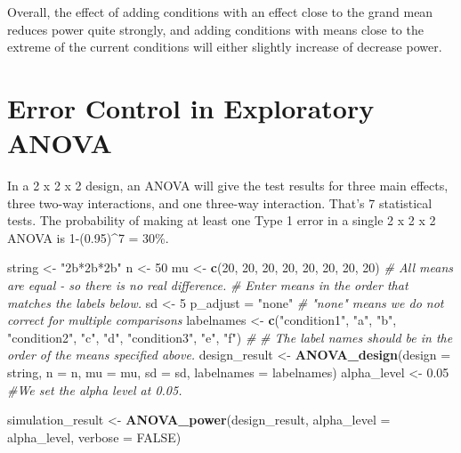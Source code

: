 \documentclass[]{book}
\newenvironment{Shaded}{\begin{snugshade}}{\end{snugshade}}
\newcommand{\CommentTok}[1]{\textcolor[rgb]{0.56,0.35,0.01}{\textit{#1}}}
\newcommand{\DataTypeTok}[1]{\textcolor[rgb]{0.13,0.29,0.53}{#1}}
\newcommand{\DecValTok}[1]{\textcolor[rgb]{0.00,0.00,0.81}{#1}}
\newcommand{\FloatTok}[1]{\textcolor[rgb]{0.00,0.00,0.81}{#1}}
\newcommand{\KeywordTok}[1]{\textcolor[rgb]{0.13,0.29,0.53}{\textbf{#1}}}
\newcommand{\NormalTok}[1]{#1}
\newcommand{\OtherTok}[1]{\textcolor[rgb]{0.56,0.35,0.01}{#1}}
\newcommand{\StringTok}[1]{\textcolor[rgb]{0.31,0.60,0.02}{#1}}
\begin{document}
Overall, the effect of adding conditions with an effect close to the grand mean reduces power quite strongly, and adding conditions with means close to the extreme of the current conditions will either slightly increase of decrease power.

\hypertarget{error-control-in-exploratory-anova}{%
\chapter{Error Control in Exploratory ANOVA}\label{error-control-in-exploratory-anova}}

In a 2 x 2 x 2 design, an ANOVA will give the test results for three main effects, three two-way interactions, and one three-way interaction. That's 7 statistical tests. The probability of making at least one Type 1 error in a single 2 x 2 x 2 ANOVA is 1-(0.95)\^{}7 = 30\%.

\begin{Shaded}
\begin{Highlighting}[]
\NormalTok{string <-}\StringTok{ "2b*2b*2b"}
\NormalTok{n <-}\StringTok{ }\DecValTok{50}
\NormalTok{mu <-}\StringTok{ }\KeywordTok{c}\NormalTok{(}\DecValTok{20}\NormalTok{, }\DecValTok{20}\NormalTok{, }\DecValTok{20}\NormalTok{, }\DecValTok{20}\NormalTok{, }\DecValTok{20}\NormalTok{, }\DecValTok{20}\NormalTok{, }\DecValTok{20}\NormalTok{, }\DecValTok{20}\NormalTok{) }
\CommentTok{# All means are equal - so there is no real difference.}
\CommentTok{# Enter means in the order that matches the labels below.}
\NormalTok{sd <-}\StringTok{ }\DecValTok{5}
\NormalTok{p_adjust =}\StringTok{ "none"}
\CommentTok{# "none" means we do not correct for multiple comparisons}
\NormalTok{labelnames <-}\StringTok{ }\KeywordTok{c}\NormalTok{(}\StringTok{"condition1"}\NormalTok{, }\StringTok{"a"}\NormalTok{, }\StringTok{"b"}\NormalTok{, }
                \StringTok{"condition2"}\NormalTok{, }\StringTok{"c"}\NormalTok{, }\StringTok{"d"}\NormalTok{, }
                \StringTok{"condition3"}\NormalTok{, }\StringTok{"e"}\NormalTok{, }\StringTok{"f"}\NormalTok{) }\CommentTok{#}
\CommentTok{# The label names should be in the order of the means specified above.}
\NormalTok{design_result <-}\StringTok{ }\KeywordTok{ANOVA_design}\NormalTok{(}\DataTypeTok{design =}\NormalTok{ string,}
                   \DataTypeTok{n =}\NormalTok{ n, }
                   \DataTypeTok{mu =}\NormalTok{ mu, }
                   \DataTypeTok{sd =}\NormalTok{ sd, }
                   \DataTypeTok{labelnames =}\NormalTok{ labelnames)}
\NormalTok{alpha_level <-}\StringTok{ }\FloatTok{0.05}
\CommentTok{#We set the alpha level at 0.05. }

\NormalTok{simulation_result <-}\StringTok{ }\KeywordTok{ANOVA_power}\NormalTok{(design_result,}
                                 \DataTypeTok{alpha_level =}\NormalTok{ alpha_level,}
                                 \DataTypeTok{verbose =} \OtherTok{FALSE}\NormalTok{)}
\end{Highlighting}
\end{Shaded}
\end{document}
